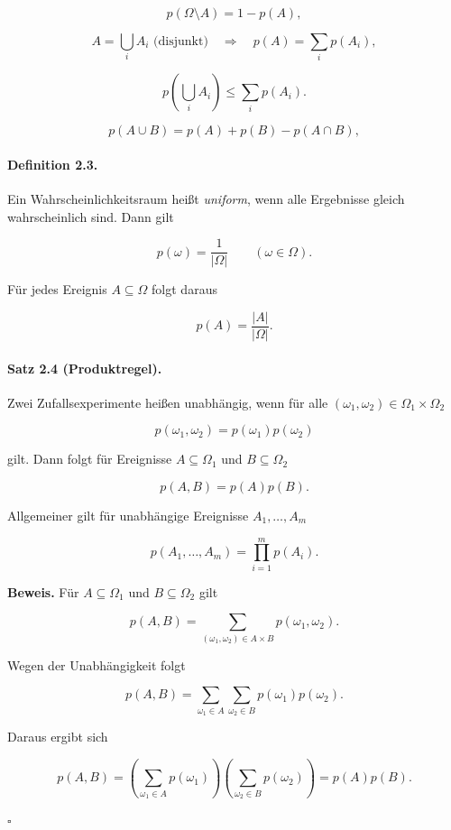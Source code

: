 \documentclass{article}
\begin{document}
\[
p(\Omega\setminus A)
=
1-p(A),
\]

\[
A=\bigcup_i A_i
\text{ (disjunkt)}
\quad\Longrightarrow\quad
p(A)=\sum_i p(A_i),
\]

\[
p\!\left(\bigcup_i A_i\right)
\leq
\sum_i p(A_i).
\]

\[
p(A\cup B)
=
p(A)+p(B)-p(A\cap B),
\]

\medskip

\paragraph{Definition 2.3.}
Ein Wahrscheinlichkeitsraum heißt \emph{uniform}, wenn alle Ergebnisse gleich wahrscheinlich sind. Dann gilt

\[
p(\omega)=\frac1{|\Omega|}
\qquad (\omega\in\Omega).
\]

Für jedes Ereignis \(A\subseteq\Omega\) folgt daraus

\[
p(A)=\frac{|A|}{|\Omega|}.
\]

\paragraph{Satz 2.4 (Produktregel).}
Zwei Zufallsexperimente heißen unabhängig, wenn für alle
\((\omega_1,\omega_2)\in\Omega_1\times\Omega_2\)

\[
p(\omega_1,\omega_2)
=
p(\omega_1)p(\omega_2)
\]

gilt. Dann folgt für Ereignisse \(A\subseteq\Omega_1\) und
\(B\subseteq\Omega_2\)

\[
p(A,B)=p(A)p(B).
\]

Allgemeiner gilt für unabhängige Ereignisse
\(A_1,\dots,A_m\)

\[
p(A_1,\dots,A_m)
=
\prod_{i=1}^{m} p(A_i).
\]

\textbf{Beweis.}
Für \(A\subseteq\Omega_1\) und \(B\subseteq\Omega_2\) gilt

\[
p(A,B)
=
\sum_{(\omega_1,\omega_2)\in A\times B}
p(\omega_1,\omega_2).
\]

Wegen der Unabhängigkeit folgt

\[
p(A,B)
=
\sum_{\omega_1\in A}\sum_{\omega_2\in B}
p(\omega_1)p(\omega_2).
\]

Daraus ergibt sich

\[
p(A,B)
=
\left(\sum_{\omega_1\in A}p(\omega_1)\right)
\left(\sum_{\omega_2\in B}p(\omega_2)\right)
=
p(A)p(B).
\]

\hfill $\square$

\medskip
\end{document}
